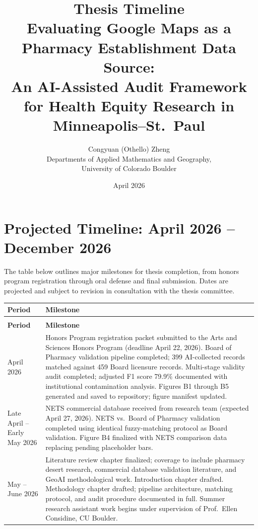 \documentclass[12pt]{article}
\title{Thesis Timeline\\[0.5em]
\large Evaluating Google Maps as a Pharmacy Establishment Data Source:\\
An AI-Assisted Audit Framework for Health Equity Research in\\
Minneapolis--St.\ Paul}
\author{Congyuan (Othello) Zheng\\
Departments of Applied Mathematics and Geography,\\
University of Colorado Boulder}
\date{April 2026}
\begin{document}
\maketitle
\thispagestyle{empty}

\section{Projected Timeline: April 2026 -- December 2026}

The table below outlines major milestones for thesis completion, from honors program registration through oral defense and final submission. Dates are projected and subject to revision in consultation with the thesis committee.

\vspace{1em}

\begin{longtable}{>{\raggedright\arraybackslash}p{}
                  >{\raggedright\arraybackslash}p{}}

\toprule
\textbf{Period} & \textbf{Milestone} \\
\midrule
\endfirsthead

\multicolumn{2}{l}{\small\textit{(continued from previous page)}} \\
\toprule
\textbf{Period} & \textbf{Milestone} \\
\midrule
\endhead

\bottomrule
\endfoot

\bottomrule
\endlastfoot

April 2026
&
Honors Program registration packet submitted to the Arts and Sciences Honors Program (deadline April 22, 2026).
Board of Pharmacy validation pipeline completed; 399 AI-collected records matched against 459 Board licensure records.
Multi-stage validity audit completed; adjusted F1 score 79.9\% documented with institutional contamination analysis.
Figures B1 through B5 generated and saved to repository; figure manifest updated.
\\[0.8em]

Late April -- Early May 2026
&
NETS commercial database received from research team (expected April 27, 2026).
NETS vs.\ Board of Pharmacy validation completed using identical fuzzy-matching protocol as Board validation.
Figure B4 finalized with NETS comparison data replacing pending placeholder bars.
\\[0.8em]

May -- June 2026
&
Literature review chapter finalized; coverage to include pharmacy desert research, commercial database validation literature, and GeoAI methodological work.
Introduction chapter drafted.
Methodology chapter drafted; pipeline architecture, matching protocol, and audit procedure documented in full.
Summer research assistant work begins under supervision of Prof.\ Ellen Considine, CU Boulder.
\\[0.8em]


\end{longtable}
\end{document}
